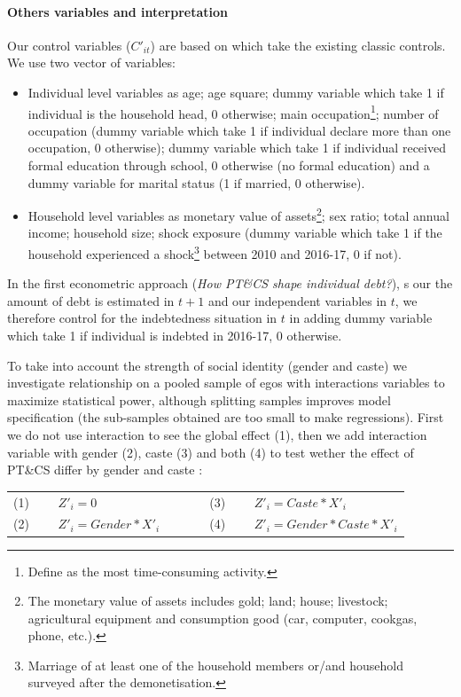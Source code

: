 \documentclass[a4paper, 11pt, onecolumn]{article}
\begin{document}
\paragraph{Others variables and interpretation}
Our control variables ($C'_{it}$) are based on \cite{Reboul2021, Brown2014, Chichaibelu2017} which take the existing classic controls. 
We use two vector of variables:
\begin{itemize}
\item Individual level variables as age; age square; dummy variable which take 1 if individual is the household head, 0 otherwise; main occupation\footnote{Define as the most time-consuming activity.}; number of occupation (dummy variable which take 1 if individual declare more than one occupation, 0 otherwise); dummy variable which take 1 if individual received formal education through school, 0 otherwise (no formal education) and a dummy variable for marital status (1 if married, 0 otherwise). 
\item Household level variables as monetary value of assets\footnote{The monetary value of assets includes gold; land; house; livestock; agricultural equipment and consumption good (car, computer, cookgas, phone, etc.).}; sex ratio; total annual income; household size; shock exposure (dummy variable which take 1 if the household experienced a shock\footnote{Marriage of at least one of the household members or/and household surveyed after the demonetisation.} between 2010 and 2016-17, 0 if not). 
\end{itemize}
In the first econometric approach (\textit{How PT\&CS shape individual debt?}), s our the amount of debt is estimated in $t+1$ and our independent variables in $t$, we therefore control for the indebtedness situation in $t$ in adding dummy variable which take 1 if individual is indebted in 2016-17, 0 otherwise.

To take into account the strength of social identity (gender and caste) we investigate relationship on a pooled sample of egos with interactions variables to maximize statistical power, although splitting samples improves model specification (the sub-samples obtained are too small to make regressions).
First we do not use interaction to see the global effect (1), then we add interaction variable with gender (2), caste (3) and both (4) to test wether the effect of PT\&CS differ by gender and caste :

\begin{table}[h!]
  \centering
    \begin{tabular}{lllll}
    (1)~~~~ $Z'_{i}=0$ & & & & (3)~~~~ $Z'_{i}=Caste*X'_{i}$ \\
    (2)~~~~ $Z'_{i}=Gender*X'_{i}$ & & & & (4)~~~~ $Z'_{i}=Gender*Caste*X'_{i}$ \\
    \end{tabular}%
\end{table}%
\end{document}
